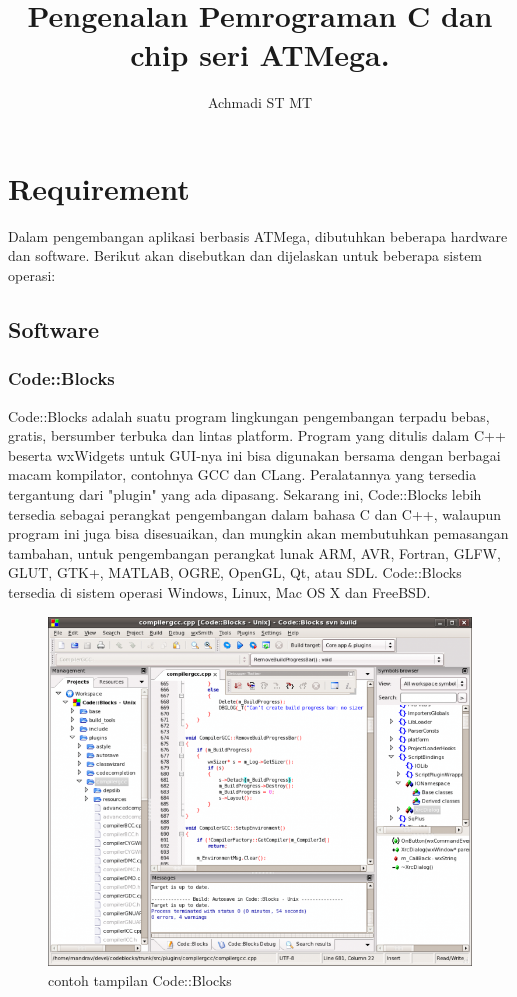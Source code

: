 \documentclass[12pt,]{article}
\title{\Large \bf
	Pengenalan Pemrograman C dan chip seri ATMega.
}
\author{Achmadi ST MT}
\date{}
\begin{document}
	\maketitle
	\thispagestyle{empty}
	\pagestyle{empty}
	
	\newpage
	\tableofcontents
	
	\newpage
	\section{Requirement}
	
	Dalam pengembangan aplikasi berbasis ATMega, dibutuhkan beberapa hardware dan software.
	Berikut akan disebutkan dan dijelaskan untuk beberapa sistem operasi:
	
	\subsection{Software}
	
	\subsubsection{Code::Blocks}
	Code::Blocks adalah suatu program lingkungan pengembangan terpadu bebas, gratis, bersumber terbuka dan lintas platform.
	Program yang ditulis dalam C++ beserta wxWidgets untuk GUI-nya ini bisa digunakan bersama dengan berbagai macam kompilator, contohnya GCC dan CLang.
	Peralatannya yang tersedia tergantung dari "plugin" yang ada dipasang.
	Sekarang ini, Code::Blocks lebih tersedia sebagai perangkat pengembangan dalam bahasa C dan C++, walaupun program ini juga bisa disesuaikan, 
	dan mungkin akan membutuhkan pemasangan tambahan, untuk pengembangan perangkat lunak ARM, AVR, Fortran, GLFW, GLUT, GTK+,  MATLAB, OGRE, OpenGL, Qt, atau SDL.
	Code::Blocks tersedia di sistem operasi Windows, Linux, Mac OS X dan FreeBSD.
	\begin{figure}[H]
		\centering
		\includegraphics[width=0.6\linewidth]{images/cb}
		\caption{contoh tampilan Code::Blocks}
	\end{figure}
\end{document}

